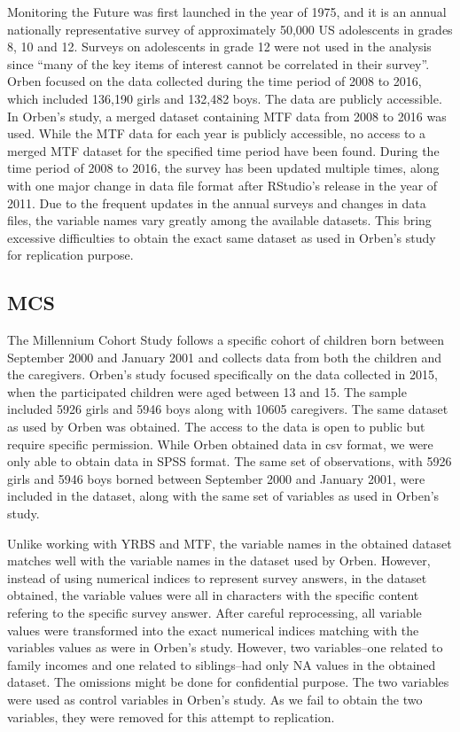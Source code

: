 \documentclass[12pt,twoside]{reedthesis}
\begin{document}
  Monitoring the Future was first launched in the year of 1975, and it is
  an annual nationally representative survey of approximately 50,000 US
  adolescents in grades 8, 10 and 12. Surveys on adolescents in grade 12
  were not used in the analysis since ``many of the key items of interest
  cannot be correlated in their survey''. Orben focused on the data
  collected during the time period of 2008 to 2016, which included 136,190
  girls and 132,482 boys. The data are publicly accessible. In Orben's
  study, a merged dataset containing MTF data from 2008 to 2016 was used.
  While the MTF data for each year is publicly accessible, no access to a
  merged MTF dataset for the specified time period have been found. During
  the time period of 2008 to 2016, the survey has been updated multiple
  times, along with one major change in data file format after RStudio's
  release in the year of 2011. Due to the frequent updates in the annual
  surveys and changes in data files, the variable names vary greatly among
  the available datasets. This bring excessive difficulties to obtain the
  exact same dataset as used in Orben's study for replication purpose.
  
  \subsection{MCS}\label{mcs}
  
  \par 
  
  The Millennium Cohort Study follows a specific cohort of children born
  between September 2000 and January 2001 and collects data from both the
  children and the caregivers. Orben's study focused specifically on the
  data collected in 2015, when the participated children were aged between
  13 and 15. The sample included 5926 girls and 5946 boys along with 10605
  caregivers. The same dataset as used by Orben was obtained. The access
  to the data is open to public but require specific permission. While
  Orben obtained data in csv format, we were only able to obtain data in
  SPSS format. The same set of observations, with 5926 girls and 5946 boys
  borned between September 2000 and January 2001, were included in the
  dataset, along with the same set of variables as used in Orben's study.
  
  \par 
  
  Unlike working with YRBS and MTF, the variable names in the obtained
  dataset matches well with the variable names in the dataset used by
  Orben. However, instead of using numerical indices to represent survey
  answers, in the dataset obtained, the variable values were all in
  characters with the specific content refering to the specific survey
  answer. After careful reprocessing, all variable values were transformed
  into the exact numerical indices matching with the variables values as
  were in Orben's study. However, two variables--one related to family
  incomes and one related to siblings--had only NA values in the obtained
  dataset. The omissions might be done for confidential purpose. The two
  variables were used as control variables in Orben's study. As we fail to
  obtain the two variables, they were removed for this attempt to
  replication.
  
\end{document}
